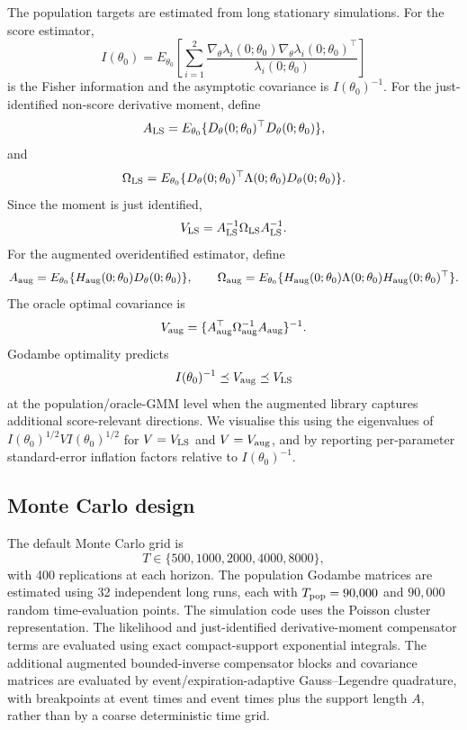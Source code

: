 The population targets are estimated from long stationary simulations.  For the score estimator,
\[
    I(\theta_0)
    =
    E_{\theta_0}\left[\sum_{i=1}^2
    \frac{\nabla_\theta\lambda_i(0;\theta_0)\nabla_\theta\lambda_i(0;\theta_0)^\top}{\lambda_i(0;\theta_0)}\right]
\]
is the Fisher information and the asymptotic covariance is $I(\theta_0)^{-1}$.  For the just-identified non-score derivative moment, define
\[
    A_{\rm LS}
    =
    E_{\theta_0}\{D_\theta(0;\theta_0)^\top D_\theta(0;\theta_0)\},
\]
and
\[
    \Omega_{\rm LS}
    =
    E_{\theta_0}\{D_\theta(0;\theta_0)^\top
    \Lambda(0;\theta_0)D_\theta(0;\theta_0)\}.
\]
Since the moment is just identified,
\[
    V_{\rm LS}
    =
    A_{\rm LS}^{-1}\Omega_{\rm LS}A_{\rm LS}^{-1}.
\]
For the augmented overidentified estimator, define
\[
    A_{\rm aug}=E_{\theta_0}\{H_{\rm aug}(0;\theta_0)D_\theta(0;\theta_0)\},
    \qquad
    \Omega_{\rm aug}=E_{\theta_0}\{H_{\rm aug}(0;\theta_0)\Lambda(0;\theta_0)H_{\rm aug}(0;\theta_0)^\top\}.
\]
The oracle optimal covariance is
\[
    V_{\rm aug}=\{A_{\rm aug}^\top\Omega_{\rm aug}^{-1}A_{\rm aug}\}^{-1}.
\]
Godambe optimality predicts
\[
    I(\theta_0)^{-1}\preceq V_{\rm aug}\preceq V_{\rm LS}
\]
at the population/oracle-GMM level when the augmented library captures additional score-relevant directions.  We visualise this using the eigenvalues of $I(\theta_0)^{1/2}VI(\theta_0)^{1/2}$ for $V=V_{\rm LS}$ and $V=V_{\rm aug}$, and by reporting per-parameter standard-error inflation factors relative to $I(\theta_0)^{-1}$.

\subsection{Monte Carlo design}

The default Monte Carlo grid is
\[
    T\in\{500,1000,2000,4000,8000\},
\]
with 400 replications at each horizon.  The population Godambe matrices are estimated using 32 independent long runs, each with $T_{\rm pop}=90{,}000$ and $90{,}000$ random time-evaluation points.  The simulation code uses the Poisson cluster representation.  The likelihood and just-identified derivative-moment compensator terms are evaluated using exact compact-support exponential integrals.  The additional augmented bounded-inverse compensator blocks and covariance matrices are evaluated by event/expiration-adaptive Gauss--Legendre quadrature, with breakpoints at event times and event times plus the support length $A$, rather than by a coarse deterministic time grid.

